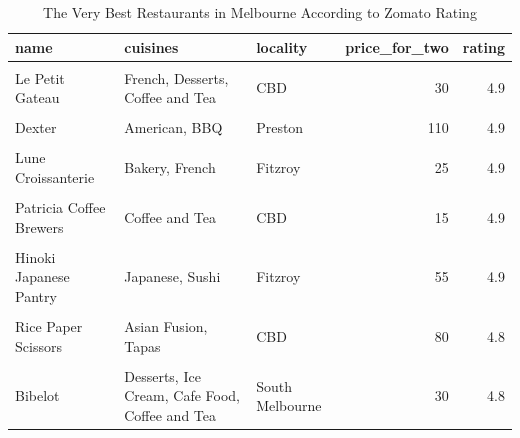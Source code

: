 \documentclass[11pt,a4paper,]{article}
\begin{document}
\begin{table}[!h]

\caption{\label{tab:best-restaurant}The Very Best Restaurants in Melbourne According to Zomato Rating}
\centering
\fontsize{8}{10}\selectfont
\begin{tabular}[t]{l|l|l|r|r}
\hline
name & cuisines & locality & price\_for\_two & rating\\
\hline
\cellcolor{pink}{Tipo 00} & \cellcolor{pink}{Italian} & \cellcolor{pink}{CBD} & \cellcolor{pink}{150} & \cellcolor{pink}{4.9}\\
\hline
Le Petit Gateau & French, Desserts, Coffee and Tea & CBD & 30 & 4.9\\
\hline
\cellcolor{pink}{Minamishima} & \cellcolor{pink}{Japanese, Sushi} & \cellcolor{pink}{Richmond} & \cellcolor{pink}{450} & \cellcolor{pink}{4.9}\\
\hline
Dexter & American, BBQ & Preston & 110 & 4.9\\
\hline
\cellcolor{pink}{Vue de monde} & \cellcolor{pink}{Australian, Contemporary} & \cellcolor{pink}{CBD} & \cellcolor{pink}{600} & \cellcolor{pink}{4.9}\\
\hline
Lune Croissanterie & Bakery, French & Fitzroy & 25 & 4.9\\
\hline
\cellcolor{pink}{Beatrix} & \cellcolor{pink}{Coffee and Tea, Bakery} & \cellcolor{pink}{North Melbourne} & \cellcolor{pink}{30} & \cellcolor{pink}{4.9}\\
\hline
Patricia Coffee Brewers & Coffee and Tea & CBD & 15 & 4.9\\
\hline
\cellcolor{pink}{Agathé Pâtisserie} & \cellcolor{pink}{Bakery, Patisserie} & \cellcolor{pink}{South Melbourne Market, South Melbourne} & \cellcolor{pink}{15} & \cellcolor{pink}{4.9}\\
\hline
Hinoki Japanese Pantry & Japanese, Sushi & Fitzroy & 55 & 4.9\\
\hline
\cellcolor{pink}{Humble Rays} & \cellcolor{pink}{Coffee and Tea, Cafe Food, Asian Fusion} & \cellcolor{pink}{Carlton} & \cellcolor{pink}{50} & \cellcolor{pink}{4.8}\\
\hline
Rice Paper Scissors & Asian Fusion, Tapas & CBD & 80 & 4.8\\
\hline
\cellcolor{pink}{Shanklin Cafe} & \cellcolor{pink}{Modern Australian, Coffee and Tea, Cafe Food} & \cellcolor{pink}{Hawthorn} & \cellcolor{pink}{50} & \cellcolor{pink}{4.8}\\
\hline
Bibelot & Desserts, Ice Cream, Cafe Food, Coffee and Tea & South Melbourne & 30 & 4.8\\

\end{tabular}
\end{table}
\end{document}
